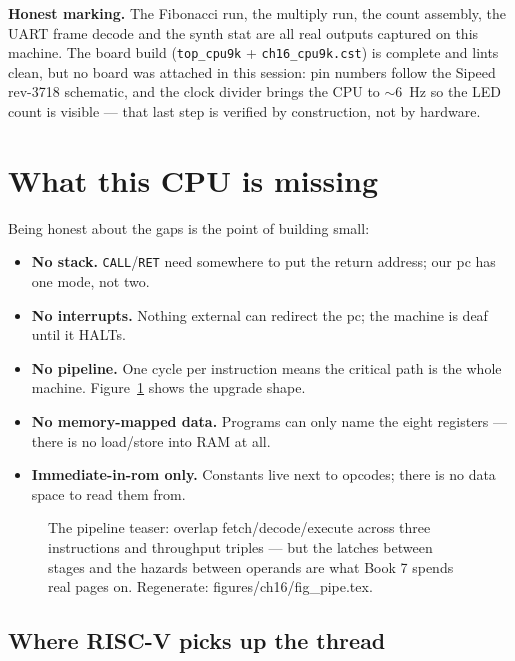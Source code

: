 \textbf{Honest marking.} The Fibonacci run, the multiply run, the
count assembly, the UART frame decode and the synth stat are all real
outputs captured on this machine. The board build (\texttt{top\_cpu9k}
+ \texttt{ch16\_cpu9k.cst}) is complete and lints clean, but no board
was attached in this session: pin numbers follow the Sipeed rev-3718
schematic, and the clock divider brings the CPU to $\sim$6~Hz so the
LED count is visible --- that last step is verified by construction,
not by hardware.

\section{What this CPU is missing}\label{sec:missing16}

Being honest about the gaps is the point of building small:

\begin{itemize}
\item \textbf{No stack.} \texttt{CALL}/\texttt{RET} need somewhere to
put the return address; our pc has one mode, not two.
\item \textbf{No interrupts.} Nothing external can redirect the pc;
the machine is deaf until it HALTs.
\item \textbf{No pipeline.} One cycle per instruction means the
critical path is the whole machine. Figure~\ref{fig:pipe16} shows the
upgrade shape.
\item \textbf{No memory-mapped data.} Programs can only name the eight
registers --- there is no load/store into RAM at all.
\item \textbf{Immediate-in-rom only.} Constants live next to opcodes;
there is no data space to read them from.
\end{itemize}

\begin{figure}[htbp]
\centering

\caption{The pipeline teaser: overlap fetch/decode/execute across
three instructions and throughput triples --- but the latches between
stages and the hazards between operands are what Book 7 spends real
pages on. Regenerate: \ttfamily figures/ch16/fig\_pipe.tex.}
\label{fig:pipe16}
\end{figure}

\subsection{Where RISC-V picks up the thread}\label{sec:riscv16}

